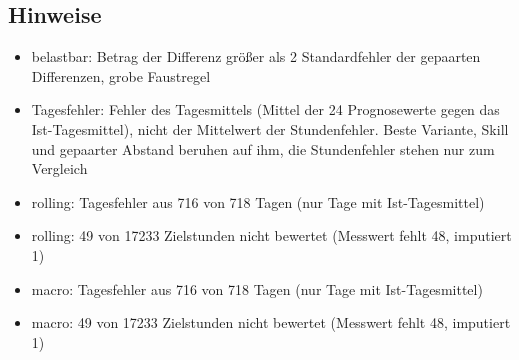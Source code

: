 \subsection*{Hinweise}
\begin{itemize}
\item belastbar: Betrag der Differenz größer als 2 Standardfehler der gepaarten Differenzen, grobe Faustregel
\item Tagesfehler: Fehler des Tagesmittels (Mittel der 24 Prognosewerte gegen das Ist-Tagesmittel), nicht der Mittelwert der Stundenfehler. Beste Variante, Skill und gepaarter Abstand beruhen auf ihm, die Stundenfehler stehen nur zum Vergleich
\item rolling: Tagesfehler aus 716 von 718 Tagen (nur Tage mit Ist-Tagesmittel)
\item rolling: 49 von 17233 Zielstunden nicht bewertet (Messwert fehlt 48, imputiert 1)
\item macro: Tagesfehler aus 716 von 718 Tagen (nur Tage mit Ist-Tagesmittel)
\item macro: 49 von 17233 Zielstunden nicht bewertet (Messwert fehlt 48, imputiert 1)
\end{itemize}
